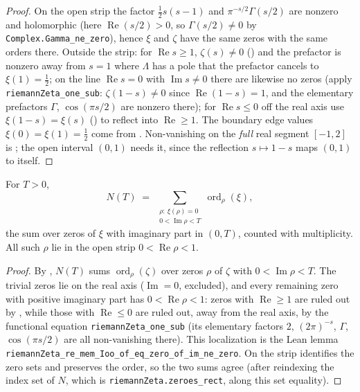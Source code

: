 \begin{proof}
\leanok
{}
On the open strip the factor $\tfrac12 s(s-1)$ and $\pi^{-s/2}\Gamma(s/2)$ are
nonzero and holomorphic (here $\operatorname{Re}(s/2)>0$, so $\Gamma(s/2)\neq0$ by
\texttt{Complex.Gamma\_ne\_zero}), hence $\xi$ and $\zeta$ have the same zeros with
the same orders there. Outside the strip: for $\operatorname{Re} s\ge1$,
$\zeta(s)\neq0$ () and the prefactor is nonzero away
from $s=1$ where $\Lambda$ has a pole that the prefactor cancels to $\xi(1)=\tfrac12$;
on the line $\operatorname{Re} s=0$ with $\operatorname{Im} s\neq0$ there are likewise
no zeros (apply \texttt{riemannZeta\_one\_sub}: $\zeta(1-s)\neq0$ since
$\operatorname{Re}(1-s)=1$, and the elementary prefactors $\Gamma$, $\cos(\pi s/2)$ are
nonzero there); for $\operatorname{Re} s\le0$ off the real axis use $\xi(1-s)=\xi(s)$
() to reflect into $\operatorname{Re}\ge1$. The boundary edge
values $\xi(0)=\xi(1)=\tfrac12$ come from . Non-vanishing on the
\emph{full} real segment $[-1,2]$ is ; the open interval
$(0,1)$ needs it, since the reflection $s\mapsto1-s$ maps $(0,1)$ to itself.
\end{proof}

\begin{lemma}
\label{lem:nf_N_eq_xi_count}
\leanok
{}
For $T>0$,
\[
  N(T) \;=\; \sum_{\substack{\rho:\ \xi(\rho)=0\\ 0<\operatorname{Im}\rho<T}}
                \operatorname{ord}_\rho(\xi),
\]
the sum over zeros of $\xi$ with imaginary part in $(0,T)$, counted with
multiplicity. All such $\rho$ lie in the open strip $0<\operatorname{Re}\rho<1$.
\end{lemma}

\begin{proof}
\leanok
{}
By , $N(T)$ sums $\operatorname{ord}_\rho(\zeta)$ over zeros $\rho$ of
$\zeta$ with $0<\operatorname{Im}\rho<T$. The trivial zeros lie on the real axis
($\operatorname{Im}=0$, excluded), and every remaining zero with positive imaginary
part has $0<\operatorname{Re}\rho<1$: zeros with $\operatorname{Re}\ge1$ are ruled out
by , while those with $\operatorname{Re}\le0$ are
ruled out, away from the real axis, by the functional equation
\texttt{riemannZeta\_one\_sub} (its elementary factors $2$, $(2\pi)^{-s}$, $\Gamma$,
$\cos(\pi s/2)$ are all non-vanishing there). This localization is the Lean lemma
\texttt{riemannZeta\_re\_mem\_Ioo\_of\_eq\_zero\_of\_im\_ne\_zero}. On the strip
 identifies the zero sets and preserves the order, so the two
sums agree (after reindexing the index set of $N$, which is
\texttt{riemannZeta.zeroes\_rect}, along this set equality).
\end{proof}


